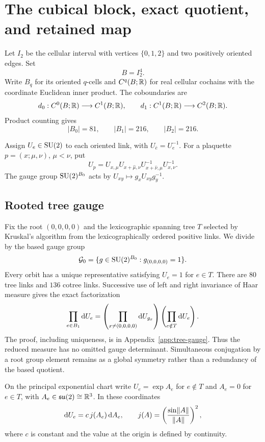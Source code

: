 \section{The cubical block, exact quotient, and retained map}\label{sec:block}

Let $I_2$ be the cellular interval with vertices $\{0,1,2\}$ and two positively
oriented edges.  Set
\[
 B=I_2^4.
\]
Write $B_q$ for its oriented $q$-cells and $C^q(B;\mathbb R)$ for real cellular
cochains with the coordinate Euclidean inner product.  The coboundaries are
\[
 d_0:C^0(B;\mathbb R)\longrightarrow C^1(B;\mathbb R),\qquad
 d_1:C^1(B;\mathbb R)\longrightarrow C^2(B;\mathbb R).
\]
Product counting gives
\begin{equation}\label{eq:cell-counts}
 |B_0|=81,\qquad |B_1|=216,\qquad |B_2|=216.
\end{equation}

Assign $U_e\in\mathrm{SU}(2)$ to each oriented link, with $U_{\bar e}=U_e^{-1}$.
For a plaquette $p=(x;\mu,\nu)$, $\mu<\nu$, put
\begin{equation}\label{eq:plaquette-holonomy}
 U_p=U_{x,\mu}U_{x+\hat\mu,\nu}
 U_{x+\hat\nu,\mu}^{-1}U_{x,\nu}^{-1}.
\end{equation}
The gauge group $\mathrm{SU}(2)^{B_0}$ acts by
$U_{xy}\mapsto g_xU_{xy}g_y^{-1}$.

\subsection{Rooted tree gauge}

Fix the root $(0,0,0,0)$ and the lexicographic spanning tree $T$ selected by
Kruskal's algorithm from the lexicographically ordered positive links.  We
divide by the based gauge group
\[
 \mathcal G_0=\{g\in\mathrm{SU}(2)^{B_0}:g_{(0,0,0,0)}=1\}.
\]
Every orbit has a unique representative satisfying $U_e=1$ for $e\in T$.
There are $80$ tree links and $136$ cotree links.  Successive use of left and
right invariance of Haar measure gives the exact factorization
\begin{equation}\label{eq:haar-factorization}
 \prod_{e\in B_1}\mathrm dU_e
 =\left(\prod_{x\ne(0,0,0,0)}\mathrm dU_{g_x}\right)
   \left(\prod_{e\notin T}\mathrm dU_e\right).
\end{equation}
The proof, including uniqueness, is in Appendix~\ref{app:tree-gauge}.  Thus
the reduced measure has no omitted gauge determinant.  Simultaneous
conjugation by a root group element remains as a global symmetry rather than a
redundancy of the based quotient.

On the principal exponential chart write $U_e=\exp A_e$ for $e\notin T$ and
$A_e=0$ for $e\in T$, with $A_e\in\mathfrak{su}(2)\cong\mathbb R^3$.  In these coordinates
\begin{equation}\label{eq:haar-log-density}
 \mathrm dU_e=c\,j(A_e)\,\mathrm d A_e,\qquad
 j(A)=\left(\frac{\sin\lVert A\rVert}{\lVert A\rVert}\right)^2,
\end{equation}
where $c$ is constant and the value at the origin is defined by continuity.

